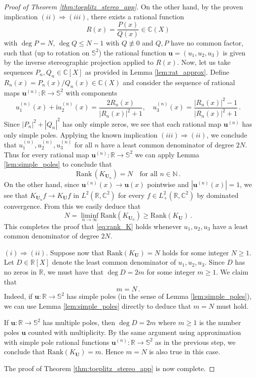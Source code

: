 \documentclass[10pt,a4paper]{amsart}
\newcommand{\C}{\mathbb{C}}
\newcommand{\N}{\mathbb{N}}
\newcommand{\R}{\mathbb{R}}
\newcommand{\Ss}{\mathbb{S}}
\newcommand{\Ub}{\mathbf{U}}
\newcommand{\ii}{\mathrm{i}}
\newcommand{\uu}{\mathbf{u}}
\renewcommand{\geq}{\geqslant}
\renewcommand{\leq}{\leqslant}
\begin{document}
\begin{proof}[Proof of Theorem \ref{thm:toeplitz_stereo_app}]
On the other hand, by the proven implication $(ii) \Rightarrow (iii)$, there exists a rational function 
$$
R(x) = \frac{P(x)}{Q(x)} \in \C(X)
$$
with $\deg P = N$, $\deg Q \leq N-1$ with $Q \not \equiv 0$ and $Q,P$ have no common factor, such that (up to rotation on $\Ss^2$) the rational function $\uu=(u_1, u_2, u_3)$ is given by the inverse stereographic projection applied to $R(x)$. Now, let us take sequences $P_n, Q_n \in \C[X]$ as provided in Lemma \ref{lem:rat_approx}. Define $R_n(x) = P_n(x)/Q_n(x) \in \C(X)$ and consider the sequence of rational maps $\uu^{(n)} : \R \to \Ss^2$ with components
$$
u_1^{(n)}(x) + \ii u_2^{(n)}(x)= \frac{2 R_n(x)}{|R_n(x)|^2 +1} , \quad u_3^{(n)}(x) = \frac{|R_n(x)|^2-1}{|R_n(x)|^2 +1} \, .
$$
Since $|P_n|^2 + |Q_n|^2$ has only simple zeros, we see that each rational map $\uu^{(n)}$ has only simple poles. Applying the known implication $(iii) \Rightarrow (ii)$, we conclude that $u_1^{(n)}, u_2^{(n)}, u_3^{(n)}$ for all $n$ have a least common denominator of degree $2N$. Thus for every rational map $\uu^{(n)} : \R \to \Ss^2$ we can apply Lemma \ref{lem:simple_poles} to conclude that
$$
\mathrm{Rank} \, (K_{\Ub_n}) = N \quad \mbox{for all $n \in \N$} \, .
$$
On the other hand, since $\uu^{(n)}(x) \to \uu(x)$ pointwise and $|\uu^{(n)}(x)| = 1$, we see that $K_{\Ub_n} f \to K_{\Ub} f$ in $L^2(\R, \C^2)$ for every $f \in L^2_+(\R, \C^2)$ by dominated convergence. From this we easily deduce that
$$
N=\liminf_{n \to \infty} \mathrm{Rank} (K_{\Ub_n}) \geq \mathrm{Rank}(K_{\Ub}) \, .
$$ 
This completes the proof that \eqref{eq:rank_K} holds whenever $u_1, u_2, u_3$ have a least common denominator of degree $2N$.

\medskip
\textbf{$(i) \Rightarrow (ii)$}.  Suppose now that $\mathrm{Rank}(K_{\Ub}) = N$ holds for some integer $N \geq 1$. Let $D \in \R[X]$ denote the least common denominator of $u_1, u_2, u_3$. Since $D$ has no zeros in $\R$, we must have that $\deg D = 2 m$ for some integer $m \geq 1$. We claim that 
$$
m=N \, .
$$ 
Indeed, if $\uu : \R \to \Ss^2$ has simple poles (in the sense of Lemma \ref{lem:simple_poles}), we can use Lemma \ref{lem:simple_poles} directly to deduce that $m=N$ must hold. 

If $\uu : \R \to \Ss^2$ has multiple poles, then $\deg D = 2m$ where $m \geq 1$ is the number poles $\uu$ counted with multiplicity. By the same argument using approximation with simple pole rational functions $\uu^{(n)} : \R \to \Ss^2$ as in the previous step, we conclude that $\mathrm{Rank}(K_{\Ub}) = m$. Hence $m=N$ is also true in this case.

The proof of Theorem \ref{thm:toeplitz_stereo_app} is now complete.
\end{proof}
\end{document}
